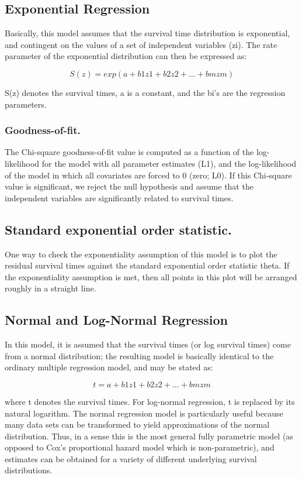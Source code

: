 \documentclass[11pt]{article} %
\begin{document}
\subsection{Exponential Regression}

 

Basically, this model assumes that the survival time distribution is exponential, and contingent on the values of a set of independent variables (zi). The rate parameter of the exponential distribution can then be expressed as:

 
\[S(z) = exp(a + b1z1 + b2z2 + ... + bmzm)\]

S(z) denotes the survival times, a is a constant, and the bi's are the regression parameters.

\subsubsection*{Goodness-of-fit.} The Chi-square goodness-of-fit value is computed as a function of the log-likelihood for the model with all parameter estimates (L1), and the log-likelihood of the model in which all covariates are forced to 0 (zero; L0). If this Chi-square value is significant, we reject the null hypothesis and assume that the independent variables are significantly related to survival times.

\subsection{Standard exponential order statistic.} One way to check the exponentiality assumption of this model is to plot the residual survival times against the standard exponential order statistic theta. If the exponentiality assumption is met, then all points in this plot will be arranged roughly in a straight line.

\subsection{Normal and Log-Normal Regression}

In this model, it is assumed that the survival times (or log survival times) come from a normal distribution; the resulting model is basically identical to the ordinary multiple regression model, and may be stated as:

\[t = a + b1z1 + b2z2 + ... + bmzm\]

where t denotes the survival times. For log-normal regression, t is replaced by its natural logarithm. The normal regression model is particularly useful because many data sets can be transformed to yield approximations of the normal distribution. Thus, in a sense this is the most general fully parametric model (as opposed to Cox's proportional hazard model which is non-parametric), and estimates can be obtained for a variety of different underlying survival distributions.
\end{document}
